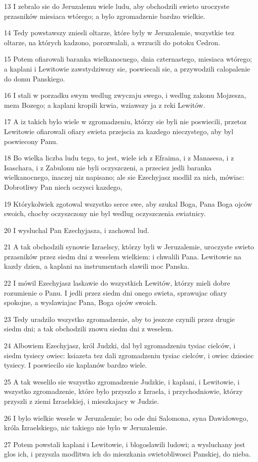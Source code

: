 \par 13 I zebralo sie do Jeruzalemu wiele ludu, aby obchodzili swieto uroczyste przasników miesiaca wtórego; a bylo zgromadzenie bardzo wielkie.
\par 14 Tedy powstawszy zniesli oltarze, które byly w Jeruzalemie, wszystkie tez oltarze, na których kadzono, porozwalali, a wrzucili do potoku Cedron.
\par 15 Potem ofiarowali baranka wielkanocnego, dnia czternastego, miesiaca wtórego; a kaplani i Lewitowie zawstydziwszy sie, poswiecali sie, a przywodzili calopalenie do domu Panskiego.
\par 16 I stali w porzadku swym wedlug zwyczaju swego, i wedlug zakonu Mojzesza, meza Bozego; a kaplani kropili krwia, wziawszy ja z reki Lewitów.
\par 17 A iz takich bylo wiele w zgromadzeniu, którzy sie byli nie poswiecili, przetoz Lewitowie ofiarowali ofiary swieta przejscia za kazdego nieczystego, aby byl poswiecony Panu.
\par 18 Bo wielka liczba ludu tego, to jest, wiele ich z Efraima, i z Manasesa, i z Isaschara, i z Zabulonu nie byli oczyszczeni, a przeciez jedli baranka wielkanocnego, inaczej niz napisano; ale sie Ezechyjasz modlil za nich, mówiac: Dobrotliwy Pan niech oczysci kazdego,
\par 19 Którykolwiek zgotowal wszystko serce swe, aby szukal Boga, Pana Boga ojców swoich, chocby oczyszczony nie byl wedlug oczyszczenia swiatnicy.
\par 20 I wysluchal Pan Ezechyjasza, i zachowal lud.
\par 21 A tak obchodzili synowie Izraelscy, którzy byli w Jeruzalemie, uroczyste swieto przasników przez siedm dni z weselem wielkiem: i chwalili Pana. Lewitowie na kazdy dzien, a kaplani na instrumentach slawili moc Panska.
\par 22 I mówil Ezechyjasz laskawie do wszystkich Lewitów, którzy mieli dobre rozumienie o Panu. I jedli przez siedm dni onego swieta, sprawujac ofiary spokojne, a wyslawiajac Pana, Boga ojców swoich.
\par 23 Tedy uradzilo wszystko zgromadzenie, aby to jeszcze czynili przez drugie siedm dni; a tak obchodzili znowu siedm dni z weselem.
\par 24 Albowiem Ezechyjasz, król Judzki, dal byl zgromadzeniu tysiac cielców, i siedm tysiecy owiec: ksiazeta tez dali zgromadzeniu tysiac cielców, i owiec dziesiec tysiecy. I poswiecilo sie kaplanów bardzo wiele.
\par 25 A tak weselilo sie wszystko zgromadzenie Judzkie, i kaplani, i Lewitowie, i wszystko zgromadzenie, które bylo przyszlo z Izraela, i przychodniowie, którzy przyszli z ziemi Izraelskiej, i mieszkajacy w Judzie.
\par 26 I bylo wielkie wesele w Jeruzalemie; bo ode dni Salomona, syna Dawidowego, króla Izraelskiego, nic takiego nie bylo w Jeruzalemie.
\par 27 Potem powstali kaplani i Lewitowie, i blogoslawili ludowi; a wysluchany jest glos ich, i przyszla modlitwa ich do mieszkania swietobliwosci Panskiej, do nieba.

